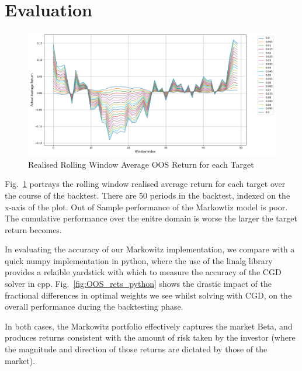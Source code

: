 \documentclass[12pt,twoside]{article}
\begin{document}
\section{Evaluation}

\begin{figure}[htbp!]
\centering %
\includegraphics[width = 1.0\hsize]{./figures/Realised_Rolling_Window_Average_OOS_Return_cpp.png} %
\caption{Realised Rolling Window Average OOS Return for each Target} 
\label{fig:OOS_rets}
\end{figure}


Fig.~\ref{fig:OOS_rets} portrays the rolling window realised average return for each target over the course of the backtest. There are 50 periods in the backtest, indexed on the x-axis of the plot. Out of Sample performance of the Markowtiz model is poor. The cumulative performance over the enitre domain is worse the larger the target return becomes. 


In evaluating the accuracy of our Markowitz implementation, we compare with a quick numpy implementation in python, where the use of the linalg library provides a relaible yardstick with which to measure the accuracy of the CGD solver in cpp. Fig.~\ref{fig:OOS_rets_python} shows the drastic impact of the fractional differences in optimal weights we see whilst solving with CGD, on the overall performance during the backtesting phase.


In both cases, the Markowitz portfolio effectively captures the market Beta, and produces returns consistent with the amount of risk taken by the investor (where the magnitude and direction of those returns are dictated by those of the market). 
\end{document}
